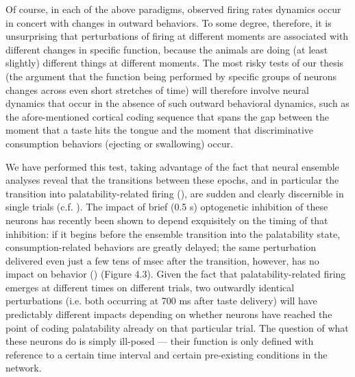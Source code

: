 \begin{refsection}
Of course, in each of the above paradigms, observed firing rates dynamics occur in concert with changes in outward behaviors. To some degree, therefore, it is unsurprising that perturbations of firing at different moments are associated with different changes in specific function, because the animals are doing (at least slightly) different things at different moments. The most risky tests of our thesis (the argument that the function being performed by specific groups of neurons changes across even short stretches of time) will therefore involve neural dynamics that occur in the absence of such outward behavioral dynamics, such as the afore-mentioned cortical coding sequence that spans the gap between the moment that a taste hits the tongue and the moment that discriminative consumption behaviors (ejecting or swallowing) occur.

We have performed this test, taking advantage of the fact that neural ensemble analyses reveal that the transitions between these epochs, and in particular the transition into palatability-related firing (\cite{sadacca2016a}), are sudden and clearly discernible in single trials (c.f. \cite{jones2007a}). The impact of brief (0.5 s) optogenetic inhibition of these neurons has recently been shown to depend exquisitely on the timing of that inhibition: if it begins before the ensemble transition into the palatability state, consumption-related behaviors are greatly delayed; the same perturbation delivered even just a few tens of msec after the transition, however, has no impact on behavior (\cite{mukherjee2019a}) (Figure 4.3). Given the fact that palatability-related firing emerges at different times on different trials, two outwardly identical perturbations (i.e. both occurring at 700 ms after taste delivery) will have predictably different impacts depending on whether neurons have reached the point of coding palatability already on that particular trial. The question of what these neurons do is simply ill-posed --- their function is only defined with reference to a certain time interval and certain pre-existing conditions in the network.


\end{refsection}
